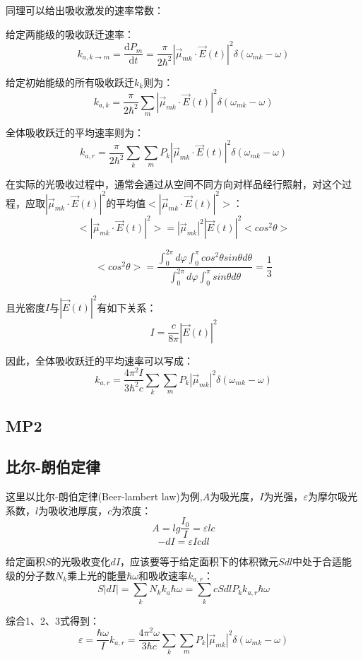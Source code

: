 同理可以给出吸收激发的速率常数：

给定两能级的吸收跃迁速率：
\[k_{a,k \rightarrow m}=\frac{\mathrm{d} P_m}{\mathrm{d}t}=\frac{\pi}{2 \hbar^2}|\overrightarrow{\mu}_{mk} \cdot \overrightarrow{E}(t)|^2 \delta(\omega_{mk}-\omega)\]

给定初始能级的所有吸收跃迁$k_{k}$则为：
\[k_{a,k}=\frac{\pi}{2 \hbar^2}\sum_m|\overrightarrow{\mu}_{mk} \cdot \overrightarrow{E}(t)|^2 \delta(\omega_{mk}-\omega)\]

全体吸收跃迁的平均速率则为：
\[k_{a,r}=\frac{\pi}{2 \hbar^2}\sum_k\sum_m P_k |\overrightarrow{\mu}_{mk} \cdot \overrightarrow{E}(t)|^2 \delta(\omega_{mk}-\omega)\]

在实际的光吸收过程中，通常会通过从空间不同方向对样品经行照射，对这个过程，应取$|\overrightarrow{\mu}_{mk} \cdot \overrightarrow{E}(t)|^2$的平均值$<|\overrightarrow{\mu}_{mk} \cdot \overrightarrow{E}(t)|^2>$：
\[<|\overrightarrow{\mu}_{mk} \cdot \overrightarrow{E}(t)|^2>=|\overrightarrow{\mu}_{mk}|^2|\overrightarrow{E}(t)|^2<cos^2 \theta>\]

\[<cos^2 \theta>=\frac{\int_0^{2\pi}d\varphi \int_0^{\pi}cos^2 \theta sin \theta d\theta}{\int_0^{2\pi}d\varphi \int_0^{\pi} sin \theta d\theta}=\frac{1}{3}\]

且光密度$I$与$|\overrightarrow{E}(t)|^2$有如下关系：
\[I=\frac{c}{8 \pi}|\overrightarrow{E}(t)|^2\]

因此，全体吸收跃迁的平均速率可以写成：
\[k_{a,r}=\frac{4\pi^2 I}{3 \hbar^2c}\sum_k\sum_m P_k |\overrightarrow{\mu}_{mk}|^2 \delta(\omega_{mk}-\omega)\]
\subsection{MP2}
\subsection{比尔-朗伯定律}

这里以比尔-朗伯定律(Beer-lambert law)为例,$A$为吸光度，$I$为光强，$\varepsilon$为摩尔吸光系数，$l$为吸收池厚度，$c$为浓度：
\[A=lg \frac{I_0}{I}=\varepsilon lc \tag{1}\]
\[-dI=\varepsilon Icdl \tag{2}\]

给定面积$S$的光吸收变化$dI$，应该要等于给定面积下的体积微元$Sdl$中处于合适能级的分子数$N_k$乘上光的能量$\hbar \omega$和吸收速率$k_{a,r}$：
\[S|dI|=\sum_kN_kk_a\hbar \omega=\sum_kcSdlP_kk_{a,r}\hbar \omega \tag{3}\]

综合1、2、3式得到：
\[\varepsilon=\frac{\hbar \omega}{I}k_{a,r}=\frac{4\pi^2 \omega}{3 \hbar c}\sum_k\sum_m P_k |\overrightarrow{\mu}_{mk}|^2 \delta(\omega_{mk}-\omega)\]

